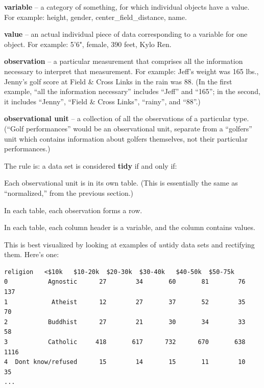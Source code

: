 \begin{compactitem}
\item \textbf{variable} -- a category of something, for which individual
objects have a value. For example: height, gender, center\_field\_distance,
name.
\item \textbf{value} -- an actual individual piece of data corresponding to a
variable for one object. For example: 5'6", female, 390 feet, Kylo Ren.
\item \textbf{observation} -- a particular measurement that comprises all the
information necessary to interpret that measurement. For example: Jeff's
weight was 165 lbs., Jenny's golf score at Field \& Cross Links in the rain
was 88. (In the first example, ``all the information necessary'' includes
``Jeff'' and ``165''; in the second, it includes ``Jenny'', ``Field \& Cross
Links'', ``rainy'', and ``88''.)
\item \textbf{observational unit} -- a collection of all the observations of a
particular type. (``Golf performances'' would be an observational unit,
separate from a ``golfers'' unit which contains information about golfers
themselves, not their particular performances.)
\end{compactitem}

\vspace{.2in}
The rule is: a data set is considered \textbf{tidy} if and only if:
\begin{compactenum}
\item Each observational unit is in its own table. (This is essentially
the same as ``normalized,'' from the previous section.)
\item In each table, each observation forms a row.
\item In each table, each column header is a variable, and the column contains
values.
\end{compactenum}

\vspace{.2in}
This is best visualized by looking at examples of \textit{un}tidy data sets
and rectifying them. Here's one:
\small
\begin{Verbatim}[fontsize=\small,samepage=true,frame=none]
            religion   <$10k   $10-20k  $20-30k  $30-40k   $40-50k  $50-75k
0           Agnostic      27        34       60       81        76      137
1            Atheist      12        27       37       52        35       70
2           Buddhist      27        21       30       34        33       58
3           Catholic     418       617      732      670       638     1116
4  Dont know/refused      15        14       15       11        10       35
...
\end{Verbatim}
\normalsize

